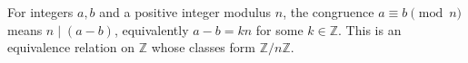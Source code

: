 
For integers $a,b$ and a positive integer modulus $n$, the congruence $a\equiv b\pmod n$ means $n\mid(a-b)$, equivalently $a-b=kn$ for some $k\in\mathbb Z$. This is an equivalence relation on $\mathbb Z$ whose classes form $\mathbb Z/n\mathbb Z$.
